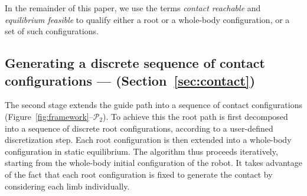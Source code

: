 \documentclass[journal]{IEEEtran}
\newcommand{\gls}[1]{\textit{#1}}
\begin{document}
In the remainder of this paper, we use the terms \gls{contact reachable} and \gls{equilibrium feasible} to qualify either a root or a whole-body configuration, or a set
of such configurations.


\subsection{Generating a discrete sequence of contact configurations --- \Pb (Section~\ref{sec:contact})}
The second stage extends the guide path into a sequence of contact configurations (Figure~\ref{fig:framework}--$\mathcal{P}_2$).
To achieve this the root path is first decomposed into a sequence of discrete root configurations, according to a user-defined discretization step.
Each root configuration is then extended into a whole-body configuration in static equilibrium.
The algorithm thus proceeds iteratively, starting from the whole-body initial configuration of the robot.
It takes advantage of the fact that each root configuration is fixed to generate the contact by considering each limb individually. 


\end{document}
